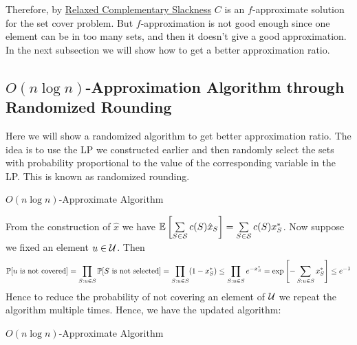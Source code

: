 Therefore, by \hyperref[th:relaxed-cs]{Relaxed Complementary Slackness} $C$ is an $f$-approximate solution for the set cover problem. But $f$-approximation is not good enough since one element can be in too many sets, and then it doesn't give a good approximation. In the next subsection we will show how to get a better approximation ratio.


\subsection{\texorpdfstring{$O(n\log n)$}{O(nlogn)}-Approximation Algorithm through Randomized Rounding}
Here we will show a randomized algorithm to get better approximation ratio. The idea is to use the LP we constructed earlier and then randomly select the sets with probability proportional to the value of the corresponding variable in the LP. This is known as randomized rounding.

\begin{algorithm}\DontPrintSemicolon
	\caption{$O(n\log n)$-Approximate Algorithm}
\end{algorithm}\parinf

From the construction of $\hat{x}$ we have $\mathbb{E}\left[\sum\limits_{S\in\mathcal{S}}c(S)\hat{x}_S\right]=\sum\limits_{S\in\mathcal{S}}c(S)x^*_S$. Now suppose we fixed an element $u\in\mathcal{U}$. Then $$\mathbb{P}[u \text{ is not covered}]=\prod\limits_{S:u\in S}\mathbb{P}[S\text{ is not selected}]=\prod\limits_{S:u\in S}(1-x^*_S)\leq \prod_{S:u\in S}e^{-x^*_S}=\exp\left[-\sum\limits_{S:u\in S}x^*_S\right]\leq e^{-1}$$Hence to reduce the probability of not covering an element of $\mathcal{U}$ we repeat the algorithm multiple times. Hence, we have the updated algorithm:
\begin{algorithm}\DontPrintSemicolon
	\caption{$O(n\log n)$-Approximate Algorithm}
\end{algorithm}\parinn


